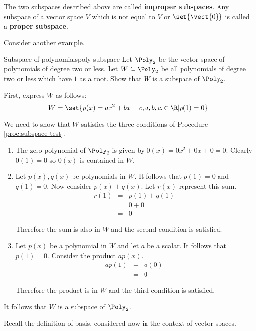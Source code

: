 The two subspaces described above are called \textbf{improper subspaces}. Any subspace of a vector space $V$ which is not equal to $V$ or  $\set{\vect{0} }$ is called a \textbf{proper subspace}. 

Consider another example.

\begin{example}{Subspace of polynomials}{poly-subspace}
Let $\Poly_2$ be the vector space of polynomials of degree two or less. Let $W \subseteq \Poly_2$ be all polynomials of degree two or less which have $1$ as a root. Show that $W$ is a subspace of $\Poly_2$. 
\end{example}

\begin{solution}
First, express $W$ as follows:
\[
W = \set{p(x) = ax^2 +bx +c, a,b,c, \in \R | p(1)  = 0 }
\]

We need to show that $W$ satisfies the three conditions of Procedure \ref{proc:subspace-test}. 
\begin{enumerate}
\item
The zero polynomial of $\Poly_2$ is given by $0(x) = 0x^2 + 0x + 0 = 0$. Clearly $0(1) = 0$ so $0(x)$ is contained in $W$. 

\item
Let $p(x), q(x)$ be polynomials in $W$.  It follows that $p(1) = 0 $ and $q(1) = 0$. Now consider $p(x) + q(x)$. Let $r(x)$ represent this sum.
\begin{eqnarray*}
r(1) &=& p(1) + q(1) \\
&=& 0 + 0 \\
&=& 0
\end{eqnarray*}

Therefore the sum is also in $W$ and the second condition is satisfied. 

\item
Let $p(x)$ be a polynomial in $W$ and let $a$ be a scalar. It follows that $p(1) = 0$. Consider the product $ap(x)$. 
\begin{eqnarray*}
ap(1) &=& a(0) \\
&=& 0
\end{eqnarray*}

Therefore the product is in $W$ and the third condition is satisfied.
\end{enumerate}

It follows that $W$ is a subspace of $\Poly_2$. 
\end{solution} 

Recall the definition of basis, considered now in the context of vector spaces.

